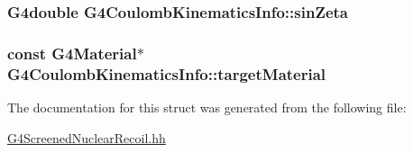 \subsubsection[{\texorpdfstring{sin\+Zeta}{sinZeta}}]{\setlength{\rightskip}{0pt plus 5cm}G4double G4\+Coulomb\+Kinematics\+Info\+::sin\+Zeta}\hypertarget{structG4CoulombKinematicsInfo_a98dcd19b562beeb8d8b4f3345b9a9a8a}{}\label{structG4CoulombKinematicsInfo_a98dcd19b562beeb8d8b4f3345b9a9a8a}
\subsubsection[{\texorpdfstring{target\+Material}{targetMaterial}}]{\setlength{\rightskip}{0pt plus 5cm}const G4\+Material$\ast$ G4\+Coulomb\+Kinematics\+Info\+::target\+Material}\hypertarget{structG4CoulombKinematicsInfo_a85b16b6a9ae7eea8d989fa93c365891b}{}\label{structG4CoulombKinematicsInfo_a85b16b6a9ae7eea8d989fa93c365891b}


The documentation for this struct was generated from the following file\+:\begin{DoxyCompactItemize}
\item 
\hyperlink{G4ScreenedNuclearRecoil_8hh}{G4\+Screened\+Nuclear\+Recoil.\+hh}\end{DoxyCompactItemize}
